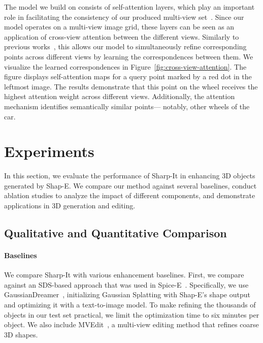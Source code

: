 The model we build on consists of self-attention layers, which play an important role in facilitating the consistency of our produced multi-view set~\cite{shi2024mvdream, wang2023imagedream}. Since our model operates on a multi-view image grid, these layers can be seen as an application of cross-view attention between the different views. Similarly to previous works~\cite{wang2023imagedream, shi2024mvdream, shi2023zero123singleimageconsistent}, this allows our model to simultaneously refine corresponding points across different views by learning the correspondences between them. 
We visualize the learned correspondences in Figure~\ref{fig:cross-view-attention}. The figure displays self-attention maps for a query point marked by a red dot in the leftmost image. The results demonstrate that this point on the wheel receives the highest attention weight across different views. Additionally, the attention mechanism identifies semantically similar points— notably, other wheels of the car.







\section{Experiments}
In this section, we evaluate the performance of Sharp-It in enhancing 3D objects generated by Shap-E. We compare our method against several baselines, conduct ablation studies to analyze the impact of different components, and demonstrate applications in 3D generation and editing.

\subsection{Qualitative and Quantitative Comparison}%
\paragraph{Baselines}

We compare Sharp-It with various enhancement baselines. First, we compare against an SDS-based approach that was used in Spice-E~\cite{sella2024spicee}. Specifically, we use GaussianDreamer~\cite{yi2024gaussiandreamerfastgenerationtext}, initializing Gaussian Splatting with Shap-E's shape output and optimizing it with a text-to-image model. 
To make refining the thousands of objects in our test set practical, we limit the optimization time to six minutes per object.
We also include MVEdit~\cite{mvedit2024}, a multi-view editing method that refines coarse 3D shapes.

